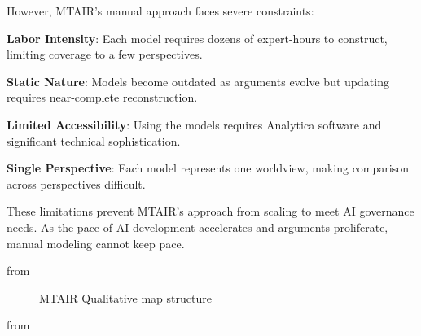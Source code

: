 \documentclass[
  11pt,
  letterpaper,
]{book}
\begin{document}
However, MTAIR's manual approach faces severe constraints:

\textbf{Labor Intensity}: Each model requires dozens of expert-hours to
construct, limiting coverage to a few perspectives.

\textbf{Static Nature}: Models become outdated as arguments evolve but
updating requires near-complete reconstruction.

\textbf{Limited Accessibility}: Using the models requires Analytica
software and significant technical sophistication.

\textbf{Single Perspective}: Each model represents one worldview, making
comparison across perspectives difficult.

These limitations prevent MTAIR's approach from scaling to meet AI
governance needs. As the pace of AI development accelerates and
arguments proliferate, manual modeling cannot keep pace.

from \textcite{clarke2022}

\begin{figure}


\caption[MTAIR Qualitative map
structure]{\label{fig-mtair-qual-map}MTAIR Qualitative map structure}

\end{figure}%

from \textcite{clarke2022}
\end{document}
